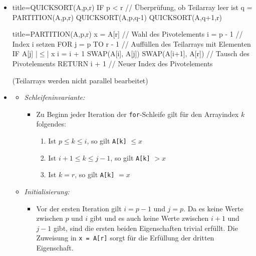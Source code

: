 \documentclass[
    ngerman,
    color=3b,
    load_common, %
    summary,
    boxarc,
]{tuda_summary}
\begin{document}
\begin{itemize}
    \item {}
          \begin{codeBlock}[autogobble,escapeinside=||]{title={QUICKSORT(A,p,r)}}
              IF p < r    // Überprüfung, ob Teilarray leer ist
                q = PARTITION(A,p,r)
                QUICKSORT(A,p,q-1)
                QUICKSORT(A,q+1,r)
          \end{codeBlock}
          \begin{codeBlock}[autogobble,escapeinside=||]{title={PARTITION(A,p,r)}}
              x = A[r]    // Wahl des Pivotelements
              i = p - 1   // Index i setzen
              FOR j = p TO r - 1 // Auffüllen des Teilarrays mit Elementen
                IF A[j] |$\leq$| x
                    i = i + 1
                    SWAP(A[i], A[j])
              SWAP(A[i+1], A[r]) // Tausch des Pivotelements
              RETURN i + 1 // Neuer Index des Pivotelements
          \end{codeBlock}
          (Teilarrays werden nicht parallel bearbeitet)
          \clearpage
    \item {}
          \begin{itemize}
              \item \textit{Schleifeninvariante:}
                    \begin{itemize}
                        \item[]
                              Zu Beginn jeder Iteration der \texttt{for}-Schleife gilt für den Arrayindex $k$ folgendes:
                              \begin{enumerate}
                                  \item Ist $p \leq k \leq i$, so gilt \texttt{A[k]} $\leq x$
                                  \item Ist $i+1 \leq k \leq j -1$, so gilt \texttt{A[k]} $> x$
                                  \item Ist $k = r$, so gilt \texttt{A[k]} $= x$
                              \end{enumerate}
                    \end{itemize}

              \item \textit{Initialisierung:}
                    \begin{itemize}
                        \item[]
                              Vor der ersten Iteration gilt $i = p - 1$ und $j = p$. Da es keine Werte zwischen $p$ und $i$
                              gibt und es auch keine Werte zwischen $i + 1$ und $j - 1$ gibt, sind die ersten beiden Eigenschaften
                              trivial erfüllt. Die Zuweisung in \texttt{x = A[r]} sorgt für die Erfüllung der dritten Eigenschaft.
                    \end{itemize}


\end{itemize}
\end{itemize}
\end{document}
